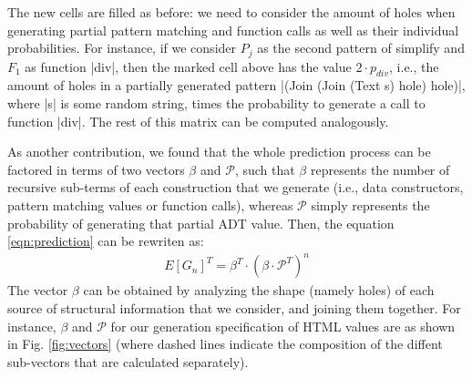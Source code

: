 The new cells are filled as before: we need to consider the amount of holes when
generating partial pattern matching and function calls as well as their
individual probabilities.
%
%
For instance, if we consider $P_j$ as the second pattern of simplify and $F_1$
as function |div|, then the marked cell above has the value $2\cdot p_{div}$,
i.e., the amount of holes in a partially generated pattern |(Join (Join (Text s)
hole) hole)|, where |s| is some random string, times the probability to generate
a call to function |div|.
%
The rest of this matrix can be computed analogously.

%

As another contribution, we found that the whole prediction process can be
factored in terms of two vectors $\beta$ and $\mathcal{P}$, such that $\beta$
represents the number of recursive sub-terms of each construction that we
generate (i.e., data constructors, pattern matching values or function calls),
whereas $\mathcal{P}$ simply represents the probability of generating that
partial ADT value.%
%
Then, the equation \ref{eqn:prediction} can be rewriten as:
%
\begin{align*}
  E[G_n]^T = \beta^T \cdot (\beta \cdot \mathcal{P}^T)^{n}
\end{align*}
%
The vector $\beta$ can be obtained by analyzing the shape (namely holes) of each
source of structural information that we consider, and joining them together.
%
For instance, $\beta$ and $\mathcal{P}$ for our generation specification of HTML
values are as shown in Fig. \ref{fig:vectors} (where dashed lines indicate the
composition of the diffent sub-vectors that are calculated separately).

